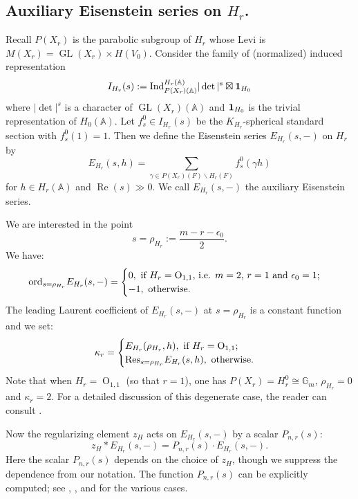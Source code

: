 \documentclass[10pt]{amsart}
\theoremstyle{plain}
\numberwithin{equation}{section}
\begin{document}
\subsection{\bf Auxiliary Eisenstein series on $H_r$.}  \label{SS:aux}
Recall $P(X_r)$ is the parabolic subgroup of $H_r$ whose Levi is
$M(X_r)={\operatorname{GL}}(X_r)\times H(V_0)$. Consider the  family of (normalized)
induced representation 
\[ 
 I_{H_r}(s) :=  {\operatorname{Ind}}_{P(X_r)({\mathbb{A}})}^{H_r({\mathbb{A}})}  |\det|^s \boxtimes
{\bf 1}_{H_0} 
\]
 where $|\det|^s$ is a character of ${\operatorname{GL}}(X_r)({\mathbb{A}})$ and  ${\bf 1}_{H_0}$ is
 the trivial representation of $H_0({\mathbb{A}})$. Let $f_s^0\in I_{H_r}(s)$ be
 the $K_{H_r}$-spherical standard section with $f_s^0(1)=1$. Then we define the
 Eisenstein series $E_{H_r}(s, -)$ on $H_r$ by
\[
E_{H_r}(s, h)=\sum_{\gamma\in P(X_r)(F)\backslash H_r(F)}f_s^0(\gamma h)
\]
for $h\in H_r({\mathbb{A}})$ and $\operatorname{Re}(s) \gg 0$. We call $E_{H_r}(s, -)$ the auxiliary Eisenstein series.
\vskip 5pt

We are interested in the point
 \[  
s =  \rho_{H_r}  :=  \frac{m- r - \epsilon_0}{2}.
 \]
 We have:
 \[  {\rm ord}_{s=\rho_{H_r}} E_{H_r}(s,-)  =  \begin{cases}
 0, \text{  if $H_r = {\operatorname{O}}_{1,1}$, i.e. $m=2$, $r=1$ and $\epsilon_0=1$;} \\
 -1, \text{  otherwise.} \end{cases} \]
The leading Laurent coefficient of $E_{H_r}(s,-)$ at $s= \rho_{H_r}$ is a constant function and we  set:
 \[  \kappa_r  = \begin{cases}
 E_{H_r}(\rho_{H_r},h) , \text{  if $H_r = {\operatorname{O}}_{1,1}$;} \\
{\rm Res}_{s = \rho_{H_r}} E_{H_r}(s,h), \text{  otherwise.}  \end{cases}
\] 
Note that when $H_r = {\operatorname{O}}_{1,1}$ (so that $r=1$), one has
$P(X_r) = H_r^0 \cong \mathbb{G}_m$,  $\rho_{H_r}  =0$ and  $\kappa_r  =2$. For a detailed discussion of this degenerate case, the reader can consult \cite[\S 3.1, Pg. 499-503]{KRS}.
  

 \vskip 5pt

Now  the regularizing element $z_H$
 acts on $E_{H_r}(s,-)$ by a scalar $P_{n,r}(s)$:
  \[   
z_H \ast E_{H_r}(s,-)  = P_{n,r}(s) \cdot E_{H_r}(s,-). 
\]
Here the scalar $P_{n,r}(s)$ depends on the choice of $z_H$, though we
suppress the dependence from our notation.
The function $P_{n,r}(s)$ can be explicitly computed; see \cite[Lemma
5.5.3]{KR5}, \cite[p. 208]{I1}, \cite[p. 249]{I2} and
\cite[Cor. 2.2.5]{T1} for the
various cases.
\vskip 5pt
\end{document}
